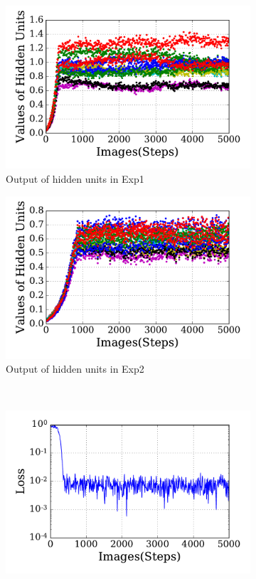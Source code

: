 \begin{figure}
\begin{subfigure}[t]{0.45\textwidth}
		\includegraphics[width=\textwidth]{pics_sdlm/31_exp_RBM_noise/exp1_hid_s.pdf}
		\caption{Output of hidden units in Exp1}
	\end{subfigure}
	\begin{subfigure}[t]{0.45\textwidth}
		\includegraphics[width=\textwidth]{pics_sdlm/31_exp_RBM_noise/exp2_hid_s.pdf}
		\caption{Output of hidden units in Exp2}
	\end{subfigure}\\
	\begin{subfigure}[t]{0.45\textwidth}
		\includegraphics[width=\textwidth]{pics_sdlm/31_exp_RBM_noise/exp1_loss_s.pdf}

\end{subfigure}
\end{figure}
